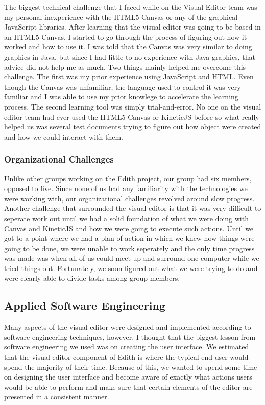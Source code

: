 \documentclass[a4paper]{article}
\begin{document}
The biggest technical challenge that I faced while on the Visual Editor team was my personal inexperience with the HTML5 Canvas or any of the graphical JavaScript libraries. After learning that the visual editor was going to be based in an HTML5 Canvas, I started to go through the process of figuring out how it worked and how to use it. I was told that the Canvas was very similar to doing graphics in Java, but since I had little to no experience with Java graphics, that advice did not help me as much. Two things mainly helped me overcome this challenge. The first was my prior experience using JavaScript and HTML. Even though the Canvas was unfamiliar, the language used to control it was very familiar and I was able to use my prior knowlege to accelerate the learning process. The second learning tool was simply trial-and-error. No one on the visual editor team had ever used the HTML5 Canvas or KineticJS before so what really helped us was several test documents trying to figure out how object were created and how we could interact with them. 

\subsubsection{Organizational Challenges}

Unlike other groups working on the Edith project, our group had six members, opposed to five. Since none of us had any familiarity with the technologies we were working with, our organizational challenges revolved around slow progress. Another challenge that surrounded the visual editor is that it was very difficult to seperate work out until we had a solid foundation of what we were doing with Canvas and KineticJS and how we were going to execute such actions. Until we got to a point where we had a plan of action in which we knew how things were going to be done, we were unable to work seperately and the only time progress was made was when all of us could meet up and surround one computer while we tried things out. Fortunately, we soon figured out what we were trying to do and were clearly able to divide tasks among group members.

\subsection{Applied Software Engineering}

Many aspects of the visual editor were designed and implemented according to software engineering techniques, however, I thought that the biggest lesson from software engineering we used was on creating the user interface. We estimated that the visual editor component of Edith is where the typical end-user would spend the majority of their time. Because of this, we wanted to spend some time on designing the user interface and become aware of exactly what actions users would be able to perform and make sure that certain elements of the editor are presented in a consistent manner.
\end{document}
